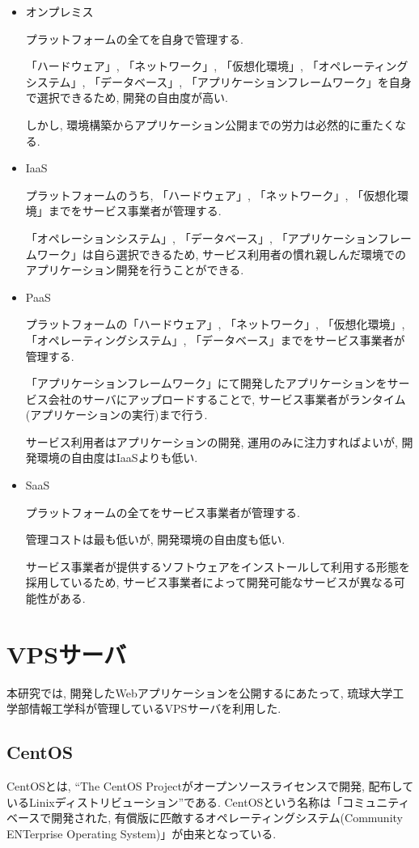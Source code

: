 \begin{itemize}
\item オンプレミス

プラットフォームの全てを自身で管理する.

「ハードウェア」, 「ネットワーク」, 「仮想化環境」, 「オペレーティングシステム」, 「データベース」, 「アプリケーションフレームワーク」を自身で選択できるため, 開発の自由度が高い.

しかし, 環境構築からアプリケーション公開までの労力は必然的に重たくなる.

\item IaaS

プラットフォームのうち, 「ハードウェア」, 「ネットワーク」, 「仮想化環境」までをサービス事業者が管理する.

「オペレーションシステム」, 「データベース」, 「アプリケーションフレームワーク」は自ら選択できるため, サービス利用者の慣れ親しんだ環境でのアプリケーション開発を行うことができる.

\item PaaS

プラットフォームの「ハードウェア」, 「ネットワーク」, 「仮想化環境」, 「オペレーティングシステム」, 「データベース」までをサービス事業者が管理する.

「アプリケーションフレームワーク」にて開発したアプリケーションをサービス会社のサーバにアップロードすることで, サービス事業者がランタイム(アプリケーションの実行)まで行う.

サービス利用者はアプリケーションの開発, 運用のみに注力すればよいが, 開発環境の自由度はIaaSよりも低い.

\item SaaS

プラットフォームの全てをサービス事業者が管理する.

管理コストは最も低いが, 開発環境の自由度も低い.

サービス事業者が提供するソフトウェアをインストールして利用する形態を採用しているため, サービス事業者によって開発可能なサービスが異なる可能性がある.
\end{itemize}

\section{VPSサーバ}
本研究では, 開発したWebアプリケーションを公開するにあたって, 琉球大学工学部情報工学科が管理しているVPSサーバを利用した.

\subsection{CentOS}
CentOSとは, “The CentOS Projectがオープンソースライセンスで開発, 配布しているLinixディストリビューション”である.
CentOSという名称は「コミュニティベースで開発された, 有償版に匹敵するオペレーティングシステム(Community ENTerprise Operating System)」が由来となっている.

